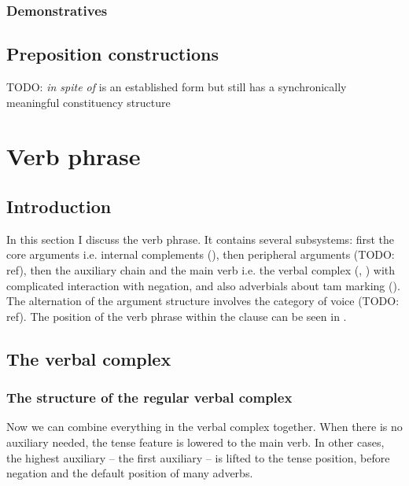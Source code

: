 \documentclass[UTF8, a4paper, oneside, scheme=plain, 12pt]{ctexbook}
\newcommand{\form}[1]{\emph{#1}}
\begin{document}
\subsection{Demonstratives}\label{sec:np.fused-head.dem}

\section{Preposition constructions}


TODO: \form{in spite of} is an established form but still has a synchronically meaningful constituency structure


\chapter{Verb phrase}\label{chap:verb-phrase}

\section{Introduction}

In this section I discuss the verb phrase. 
It contains several subsystems: 
first the core arguments i.e. internal complements (),
then peripheral arguments (TODO: ref), 
then the auxiliary chain and the main verb i.e. the verbal complex
(, ) 
with complicated interaction with negation, 
and also adverbials about \acs{tam} marking 
(). 
The alternation of the argument structure involves the category of voice (TODO: ref).
The position of the verb phrase within the clause can be seen in .

\section{The verbal complex}\label{sec:verbal-complex}

\subsection{The structure of the regular verbal complex}

Now we can combine everything in the verbal complex together.
When there is no auxiliary needed,
the tense feature is lowered to the main verb. 
In other cases, the highest auxiliary -- the first auxiliary -- 
is lifted to the tense position,
before negation and the default position of many adverbs.
\end{document}
